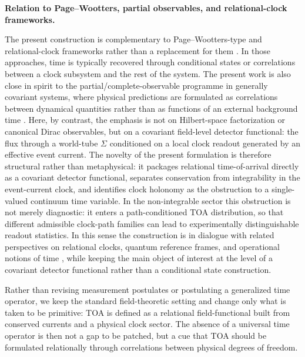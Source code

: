 \documentclass[11pt, a4paper]{article}
\theoremstyle{definition}
\theoremstyle{plain}
\theoremstyle{remark}
\numberwithin{equation}{section}
\begin{document}
        \medskip\noindent\textbf{Relation to Page--Wootters, partial observables, and relational-clock frameworks.}\par
            The present construction is complementary to Page--Wootters-type and relational-clock frameworks rather than a replacement for them \cite{PageWootters1983,Wootters1984}. In those approaches, time is typically recovered through conditional states or correlations between a clock subsystem and the rest of the system. The present work is also close in spirit to the partial/complete-observable programme in generally covariant systems, where physical predictions are formulated as correlations between dynamical quantities rather than as functions of an external background time \cite{Rovelli2002PartialObservables,Dittrich2007PartialComplete,Tambornino2012RelationalObservables,Marolf1995AlmostIdealClocks}. Here, by contrast, the emphasis is not on Hilbert-space factorization or canonical Dirac observables, but on a covariant field-level detector functional: the flux through a world-tube $\Sigma$ conditioned on a local clock readout generated by an effective event current. The novelty of the present formulation is therefore structural rather than metaphysical: it packages relational time-of-arrival directly as a covariant detector functional, separates conservation from integrability in the event-current clock, and identifies clock holonomy as the obstruction to a single-valued continuum time variable. In the non-integrable sector this obstruction is not merely diagnostic: it enters a path-conditioned TOA distribution, so that different admissible clock-path families can lead to experimentally distinguishable readout statistics. In this sense the construction is in dialogue with related perspectives on relational clocks, quantum reference frames, and operational notions of time \cite{GambiniPullin2021,HohnSmith2020,Giovannetti2015}, while keeping the main object of interest at the level of a covariant detector functional rather than a conditional state construction.
            
            Rather than revising measurement postulates or postulating a generalized time operator, we keep the standard field-theoretic setting and change only what is taken to be primitive: TOA is defined as a relational field-functional built from conserved currents and a physical clock sector. The absence of a universal time operator is then not a gap to be patched, but a cue that TOA should be formulated relationally through correlations between physical degrees of freedom.
\end{document}
